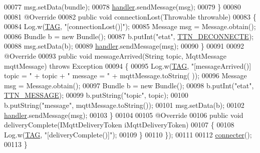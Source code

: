 \begin{DoxyCode}
00077                 msg.setData(bundle);
00078                 \hyperlink{classcom_1_1example_1_1bee__honeyt_1_1_communication_add1a0705dba503c1c4c7a3168a571b20}{handler}.sendMessage(msg);
00079             \}
00080 
00081             @Override
00082             \textcolor{keyword}{public} \textcolor{keywordtype}{void} connectionLost(Throwable throwable)
00083             \{
00084                 Log.w(\hyperlink{classcom_1_1example_1_1bee__honeyt_1_1_communication_a848338dd9654af654c7e681742666785}{TAG}, \textcolor{stringliteral}{"[connectionLost()]"});
00085                 Message msg = Message.obtain();
00086                 Bundle b = \textcolor{keyword}{new} Bundle();
00087                 b.putInt(\textcolor{stringliteral}{"etat"}, \hyperlink{classcom_1_1example_1_1bee__honeyt_1_1_communication_ae2fba68d5f0ed6c8bdbaaae68a4e6192}{TTN\_DECONNECTE});
00088                 msg.setData(b);
00089                 \hyperlink{classcom_1_1example_1_1bee__honeyt_1_1_communication_add1a0705dba503c1c4c7a3168a571b20}{handler}.sendMessage(msg);
00090             \}
00091 
00092             @Override
00093             \textcolor{keyword}{public} \textcolor{keywordtype}{void} messageArrived(String topic, MqttMessage mqttMessage) \textcolor{keywordflow}{throws} Exception
00094             \{
00095                 Log.w(\hyperlink{classcom_1_1example_1_1bee__honeyt_1_1_communication_a848338dd9654af654c7e681742666785}{TAG}, \textcolor{stringliteral}{"[messageArrived()] topic = "} + topic + \textcolor{stringliteral}{" message = "} + mqttMessage.toString(
      ));
00096                 Message msg = Message.obtain();
00097                 Bundle b = \textcolor{keyword}{new} Bundle();
00098                 b.putInt(\textcolor{stringliteral}{"etat"}, \hyperlink{classcom_1_1example_1_1bee__honeyt_1_1_communication_aa81848662846946c92ee2b1380669c66}{TTN\_MESSAGE});
00099                 b.putString(\textcolor{stringliteral}{"topic"}, topic);
00100                 b.putString(\textcolor{stringliteral}{"message"}, mqttMessage.toString());
00101                 msg.setData(b);
00102                 \hyperlink{classcom_1_1example_1_1bee__honeyt_1_1_communication_add1a0705dba503c1c4c7a3168a571b20}{handler}.sendMessage(msg);
00103             \}
00104 
00105             @Override
00106             \textcolor{keyword}{public} \textcolor{keywordtype}{void} deliveryComplete(IMqttDeliveryToken iMqttDeliveryToken)
00107             \{
00108                 Log.w(\hyperlink{classcom_1_1example_1_1bee__honeyt_1_1_communication_a848338dd9654af654c7e681742666785}{TAG}, \textcolor{stringliteral}{"[deliveryComplete()]"});
00109             \}
00110         \});
00111 
00112         \hyperlink{classcom_1_1example_1_1bee__honeyt_1_1_communication_aadc176b28bce357bf655d0feec024013}{connecter}();
00113     \}
\end{DoxyCode}


